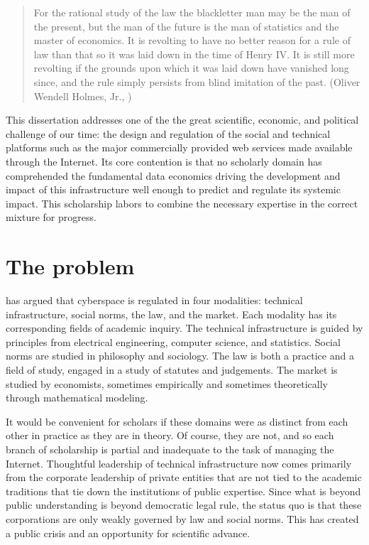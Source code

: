 \documentclass[../thesis.tex]{subfiles}
\begin{document}
 \begin{quote}
 For the rational study of the law the blackletter man may be the man of the present, but the man of the future is the man of statistics and the master of economics. It is revolting to have no better reason for a rule of law than that so it was laid down in the time of Henry IV. It is still more revolting if the grounds upon which it was laid down have vanished long since, and the rule simply persists from blind imitation of the past. (Oliver Wendell Holmes, Jr., \cite{holmes1897path})
 \end{quote}
 
 This dissertation addresses one of the the great scientific, economic,
 and political challenge of our time: the design and regulation of
 the social and technical platforms such as the major commercially
 provided web services made available through the Internet.
 Its core contention is that no scholarly domain has comprehended the
 fundamental data economics driving the development and impact of this
 infrastructure well enough to predict and regulate its systemic impact.
 This scholarship labors to combine the necessary expertise in the
 correct mixture for progress.

\section{The problem}
 
 \citet{lessig2009code} has argued that cyberspace is regulated
 in four modalities: technical infrastructure, social norms,
 the law, and the market.
 Each modality has its corresponding fields of academic inquiry.
 The technical infrastructure is guided by principles from
 electrical engineering, computer science, and statistics.
 Social norms are studied in philosophy and sociology.
 The law is both a practice and a field of study,
 engaged in a study of statutes and judgements.
 The market is studied by economists, sometimes empirically
 and sometimes theoretically through mathematical modeling.

 It would be convenient for scholars if these domains were
 as distinct from each other in practice as they are in
 theory.
 Of course, they are not, and so each branch of scholarship
 is partial and inadequate to the task of managing the Internet.
 Thoughtful leadership of technical infrastructure now comes
 primarily from the corporate leadership of private entities
 that are not tied to the academic traditions that tie down
 the institutions of public expertise.
 Since what is beyond public understanding is beyond democratic
 legal rule, the status quo is that these corporations are only
 weakly governed by law and social norms.
 This has created a public crisis and an opportunity for
 scientific advance.
 
\end{document}
